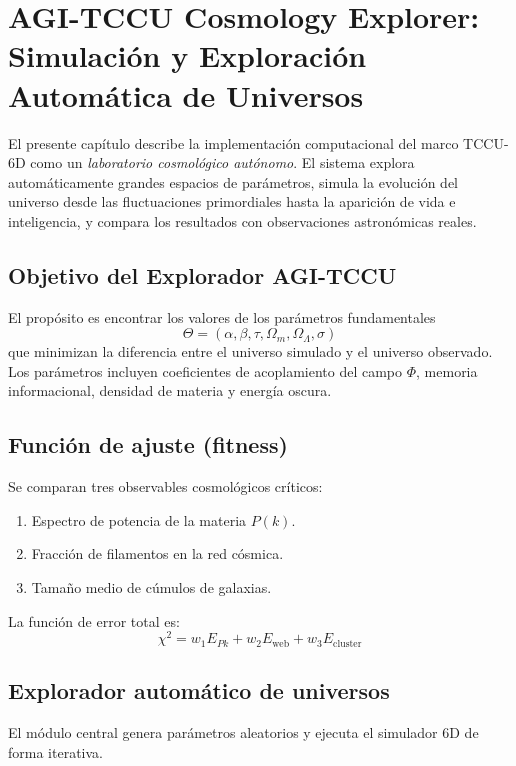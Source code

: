 \chapter{AGI-TCCU Cosmology Explorer: Simulación y Exploración Automática de Universos}
\label{chap:cosmology_explorer}

El presente capítulo describe la implementación computacional del marco TCCU-6D como un \emph{laboratorio cosmológico autónomo}. El sistema explora automáticamente grandes espacios de parámetros, simula la evolución del universo desde las fluctuaciones primordiales hasta la aparición de vida e inteligencia, y compara los resultados con observaciones astronómicas reales.

\section{Objetivo del Explorador AGI-TCCU}
El propósito es encontrar los valores de los parámetros fundamentales
\begin{equation}
\Theta = (\alpha,\beta,\tau,\Omega_m,\Omega_\Lambda,\sigma)
\end{equation}
que minimizan la diferencia entre el universo simulado y el universo observado. Los parámetros incluyen coeficientes de acoplamiento del campo $\Phi$, memoria informacional, densidad de materia y energía oscura.

\section{Función de ajuste (fitness)}
Se comparan tres observables cosmológicos críticos:
\begin{enumerate}
    \item Espectro de potencia de la materia $P(k)$.
    \item Fracción de filamentos en la red cósmica.
    \item Tamaño medio de cúmulos de galaxias.
\end{enumerate}
La función de error total es:
\begin{equation}
\chi^2 = w_1 E_{Pk} + w_2 E_{\text{web}} + w_3 E_{\text{cluster}}
\end{equation}

\section{Explorador automático de universos}
El módulo central genera parámetros aleatorios y ejecuta el simulador 6D de forma iterativa.

